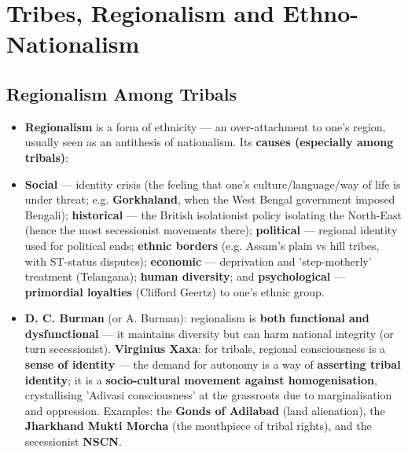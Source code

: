\chapter{Tribes, Regionalism and Ethno-Nationalism}

\section{Regionalism Among Tribals}

\begin{KeyConcept}
\begin{itemize}
\item \textbf{Regionalism} is a form of ethnicity --- an over-attachment to one's region, usually seen as an antithesis of nationalism. Its \textbf{causes (especially among tribals)}:
\item \textbf{Social} --- identity crisis (the feeling that one's culture/language/way of life is under threat; e.g. \textbf{Gorkhaland}, when the West Bengal government imposed Bengali); \textbf{historical} --- the British isolationist policy isolating the North-East (hence the most secessionist movements there); \textbf{political} --- regional identity used for political ends; \textbf{ethnic borders} (e.g. Assam's plain vs hill tribes, with ST-status disputes); \textbf{economic} --- deprivation and 'step-motherly' treatment (Telangana); \textbf{human diversity}; and \textbf{psychological} --- \textbf{primordial loyalties} (Clifford Geertz) to one's ethnic group.
\item \textbf{D. C. Burman} (or A. Burman): regionalism is \textbf{both functional and dysfunctional} --- it maintains diversity but can harm national integrity (or turn secessionist). \textbf{Virginius Xaxa}: for tribals, regional consciousness is a \textbf{sense of identity} --- the demand for autonomy is a way of \textbf{asserting tribal identity}; it is a \textbf{socio-cultural movement against homogenisation}, crystallising 'Adivasi consciousness' at the grassroots due to marginalisation and oppression. Examples: the \textbf{Gonds of Adilabad} (land alienation), the \textbf{Jharkhand Mukti Morcha} (the mouthpiece of tribal rights), and the secessionist \textbf{NSCN}.
\end{itemize}
\end{KeyConcept}

